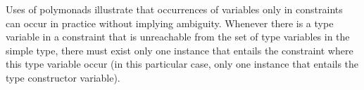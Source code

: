 Uses of polymonads illustrate that occurrences of variables only in
constraints can occur in practice without implying ambiguity.
Whenever there is a type variable in a constraint that is unreachable
from the set of type variables in the simple type, there must exist
only one instance that entails the constraint where this type variable
occur (in this particular case, only one instance that entails the
type constructor variable).


